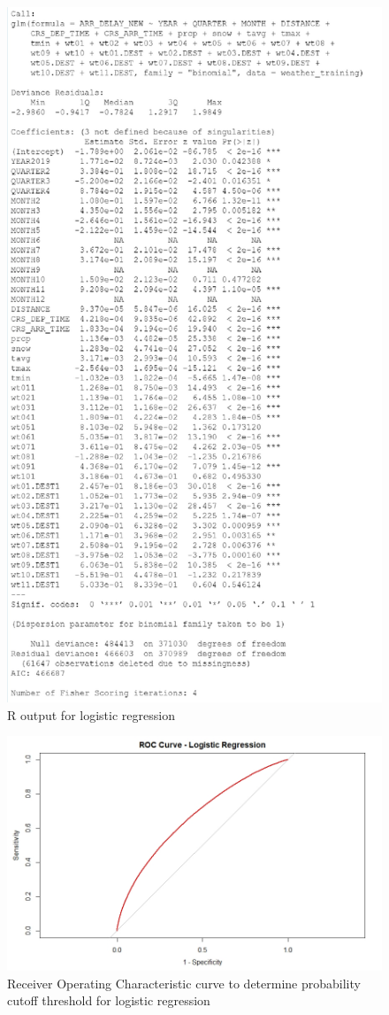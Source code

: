 \documentclass[12pt, a4paper, openany]{book}
\begin{document}
			\begin{figure}[h]
			\centering
	 		\includegraphics[width = .8\textwidth]{../figures/PLOTS FOR REPORT/Logistic Regression/summary(logit_reg)}
	 		\caption{R output for logistic regression}
	 		\end{figure}

			\begin{figure}[h]
			\centering
	 		\includegraphics[width = 1\textwidth]{../figures/PLOTS FOR REPORT/Logistic Regression/ROC Curve - Logistic Regression}
	 		\caption{Receiver Operating Characteristic curve to determine probability cutoff threshold for logistic regression}
	 		\end{figure}
\end{document}
